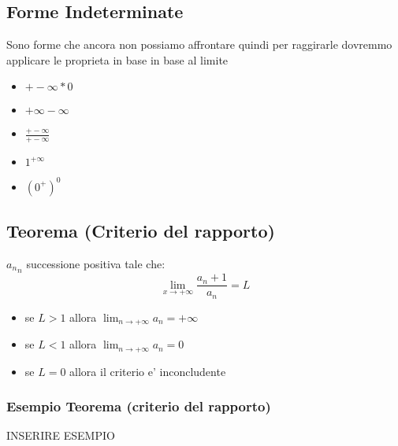 \documentclass{article}
\begin{document}
\begin{flushleft}
\begin{flushleft}
                \subsection{Forme Indeterminate}
                \begin{flushleft}
                Sono forme che ancora non possiamo affrontare quindi per raggirarle dovremmo applicare le proprieta in base
                in base al limite
                 \begin{itemize}
                  \item $+-\infty*0$
                  \item $+\infty-\infty$
                  \item $\frac{+-\infty}{+-\infty}$
                  \item $1^{+\infty}$
                  \item $(0^+)^0$
                 \end{itemize}
                \end{flushleft}
        \end{flushleft}
        \subsection{Teorema (Criterio del rapporto)}
        \begin{flushleft}
            ${a_n}_n$ successione positiva tale che:
            \begin{equation}
                \lim_{x\to+\infty} \frac{a_n+1}{a_n}=L
            \end{equation}
            \begin{itemize}
                \item se $L>1$ allora $\lim_{n\to+\infty} a_n = +\infty$
                \item se $L<1$ allora $\lim_{n\to+\infty} a_n = 0$
                \item se $L=0$ allora il criterio e' inconcludente
            \end{itemize}
        \end{flushleft}
        \end{flushleft}
        \subsubsection{Esempio Teorema (criterio del rapporto)}
        \begin{flushleft}
            INSERIRE ESEMPIO
        \end{flushleft}
\end{document}
